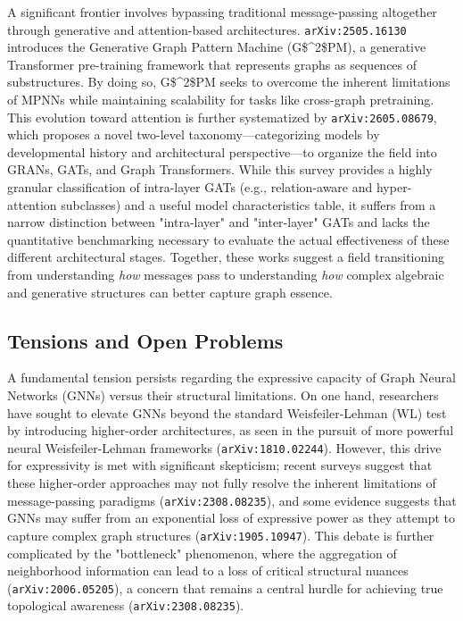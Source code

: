 \documentclass[11pt]{article}
\begin{document}
A significant frontier involves bypassing traditional message-passing altogether through generative and attention-based architectures. \texttt{arXiv:2505.16130} introduces the Generative Graph Pattern Machine (G\$\textasciicircum{}2\$PM), a generative Transformer pre-training framework that represents graphs as sequences of substructures. By doing so, G\$\textasciicircum{}2\$PM seeks to overcome the inherent limitations of MPNNs while maintaining scalability for tasks like cross-graph pretraining. This evolution toward attention is further systematized by \texttt{arXiv:2605.08679}, which proposes a novel two-level taxonomy—categorizing models by developmental history and architectural perspective—to organize the field into GRANs, GATs, and Graph Transformers. While this survey provides a highly granular classification of intra-layer GATs (e.g., relation-aware and hyper-attention subclasses) and a useful model characteristics table, it suffers from a narrow distinction between "intra-layer" and "inter-layer" GATs and lacks the quantitative benchmarking necessary to evaluate the actual effectiveness of these different architectural stages. Together, these works suggest a field transitioning from understanding \textit{how} messages pass to understanding \textit{how} complex algebraic and generative structures can better capture graph essence.

\subsection{Tensions and Open Problems}

A fundamental tension persists regarding the expressive capacity of Graph Neural Networks (GNNs) versus their structural limitations. On one hand, researchers have sought to elevate GNNs beyond the standard Weisfeiler-Lehman (WL) test by introducing higher-order architectures, as seen in the pursuit of more powerful neural Weisfeiler-Lehman frameworks (\texttt{arXiv:1810.02244}). However, this drive for expressivity is met with significant skepticism; recent surveys suggest that these higher-order approaches may not fully resolve the inherent limitations of message-passing paradigms (\texttt{arXiv:2308.08235}), and some evidence suggests that GNNs may suffer from an exponential loss of expressive power as they attempt to capture complex graph structures (\texttt{arXiv:1905.10947}). This debate is further complicated by the "bottleneck" phenomenon, where the aggregation of neighborhood information can lead to a loss of critical structural nuances (\texttt{arXiv:2006.05205}), a concern that remains a central hurdle for achieving true topological awareness (\texttt{arXiv:2308.08235}).
\end{document}
